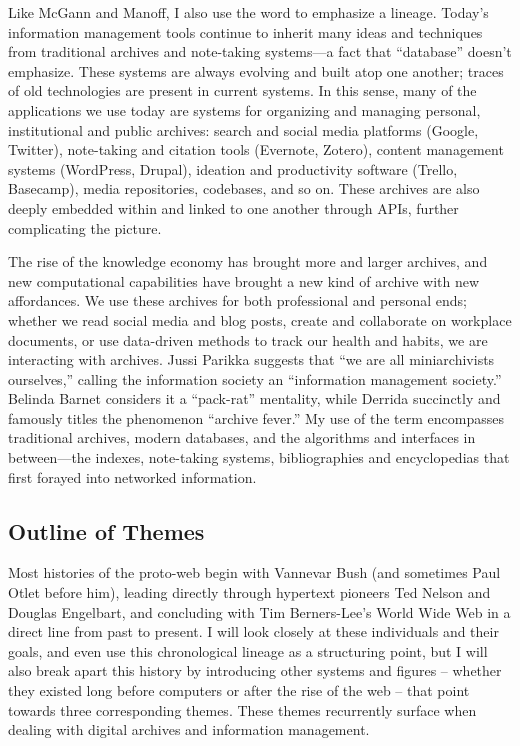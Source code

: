 Like McGann and Manoff, I also use the word to emphasize a lineage. Today’s information management tools continue to inherit many ideas and techniques from traditional archives and note-taking systems—a fact that “database” doesn’t emphasize. These systems are always evolving and built atop one another; traces of old technologies are present in current systems. In this sense, many of the applications we use today are systems for organizing and managing personal, institutional and public archives: search and social media platforms (Google, Twitter), note-taking and citation tools (Evernote, Zotero), content management systems (WordPress, Drupal), ideation and productivity software (Trello, Basecamp), media repositories, codebases, and so on. These archives are also deeply embedded within and linked to one another through APIs, further complicating the picture.

The rise of the knowledge economy has brought more and larger archives, and new computational capabilities have brought a new kind of archive with new affordances. We use these archives for both professional and personal ends; whether we read social media and blog posts, create and collaborate on workplace documents, or use data-driven methods to track our health and habits, we are interacting with archives. Jussi Parikka suggests that “we are all miniarchivists ourselves,” calling the information society an “information management society.”  Belinda Barnet considers it a “pack-rat” mentality, while Derrida succinctly and famously titles the phenomenon “archive fever.”  My use of the term encompasses traditional archives, modern databases, and the algorithms and interfaces in between—the indexes, note-taking systems, bibliographies and encyclopedias that first forayed into networked information.

\subsection{Outline of Themes}

Most histories of the proto-web begin with Vannevar Bush (and sometimes Paul Otlet before him), leading directly through hypertext pioneers Ted Nelson and Douglas Engelbart, and concluding with Tim Berners-Lee’s World Wide Web in a direct line from past to present. I will look closely at these individuals and their goals, and even use this chronological lineage as a structuring point, but I will also break apart this history by introducing other systems and figures – whether they existed long before computers or after the rise of the web – that point towards three corresponding themes. These themes recurrently surface when dealing with digital archives and information management.

